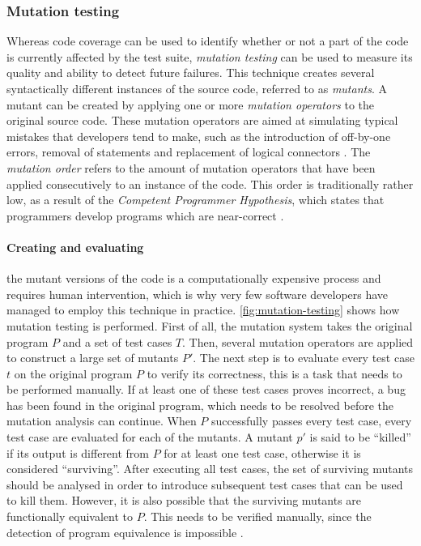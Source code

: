 \subsubsection{Mutation testing}
Whereas code coverage can be used to identify whether or not a part of the code is currently affected by the test suite, \emph{mutation testing} can be used to measure its quality and ability to detect future failures. This technique creates several syntactically different instances of the source code, referred to as \emph{mutants}. A mutant can be created by applying one or more \emph{mutation operators} to the original source code. These mutation operators are aimed at simulating typical mistakes that developers tend to make, such as the introduction of off-by-one errors, removal of statements and replacement of logical connectors \cite{Offutt2001}. The \emph{mutation order} refers to the amount of mutation operators that have been applied consecutively to an instance of the code. This order is traditionally rather low, as a result of the \emph{Competent Programmer Hypothesis}, which states that programmers develop programs which are near-correct \cite{5487526}.

\paragraph*{Creating and evaluating} the mutant versions of the code is a computationally expensive process and requires human intervention, which is why very few software developers have managed to employ this technique in practice. \autoref{fig:mutation-testing} shows how mutation testing is performed. First of all, the mutation system takes the original program $P$ and a set of test cases $T$. Then, several mutation operators are applied to construct a large set of mutants $P'$. The next step is to evaluate every test case $t$ on the original program $P$ to verify its correctness, this is a task that needs to be performed manually. If at least one of these test cases proves incorrect, a bug has been found in the original program, which needs to be resolved before the mutation analysis can continue. When $P$ successfully passes every test case, every test case are evaluated for each of the mutants. A mutant $p'$ is said to be ``killed'' if its output is different from $P$ for at least one test case, otherwise it is considered ``surviving''. After executing all test cases, the set of surviving mutants should be analysed in order to introduce subsequent test cases that can be used to kill them. However, it is also possible that the surviving mutants are functionally equivalent to $P$. This needs to be verified manually, since the detection of program equivalence is impossible \cite{5487526, Offutt2001}.

